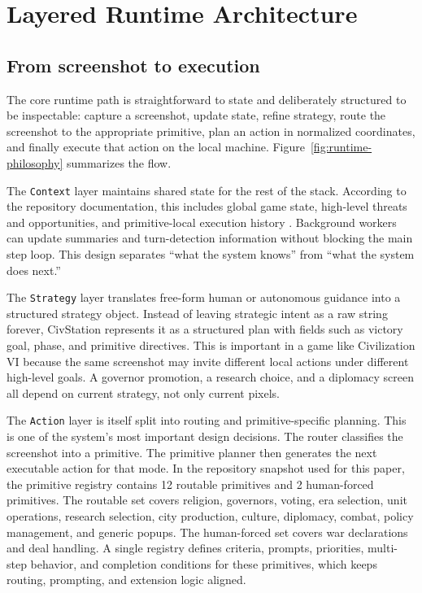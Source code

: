 \section{Layered Runtime Architecture}

\subsection{From screenshot to execution}

The core runtime path is straightforward to state and deliberately structured to be inspectable: capture a screenshot, update state, refine strategy, route the screenshot to the appropriate primitive, plan an action in normalized coordinates, and finally execute that action on the local machine. Figure~\ref{fig:runtime-philosophy} summarizes the flow.

The \texttt{Context} layer maintains shared state for the rest of the stack. According to the repository documentation, this includes global game state, high-level threats and opportunities, and primitive-local execution history \cite{civstation_repo}. Background workers can update summaries and turn-detection information without blocking the main step loop. This design separates ``what the system knows'' from ``what the system does next.''

The \texttt{Strategy} layer translates free-form human or autonomous guidance into a structured strategy object. Instead of leaving strategic intent as a raw string forever, CivStation represents it as a structured plan with fields such as victory goal, phase, and primitive directives. This is important in a game like Civilization VI because the same screenshot may invite different local actions under different high-level goals. A governor promotion, a research choice, and a diplomacy screen all depend on current strategy, not only current pixels.

The \texttt{Action} layer is itself split into routing and primitive-specific planning. This is one of the system's most important design decisions. The router classifies the screenshot into a primitive. The primitive planner then generates the next executable action for that mode. In the repository snapshot used for this paper, the primitive registry contains 12 routable primitives and 2 human-forced primitives. The routable set covers religion, governors, voting, era selection, unit operations, research selection, city production, culture, diplomacy, combat, policy management, and generic popups. The human-forced set covers war declarations and deal handling. A single registry defines criteria, prompts, priorities, multi-step behavior, and completion conditions for these primitives, which keeps routing, prompting, and extension logic aligned.

